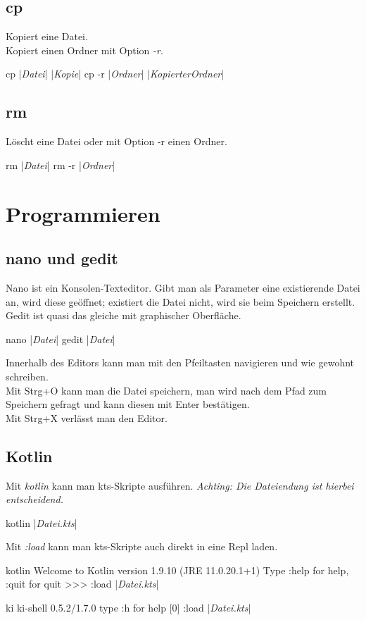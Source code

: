 \subsection{cp}
Kopiert eine Datei.\\
Kopiert einen Ordner mit Option \textit{-r}.
\begin{bashcode}
    cp |\textit{Datei}| |\textit{Kopie}|
    cp -r |\textit{Ordner}| |\textit{KopierterOrdner}|
\end{bashcode}

\subsection{rm}
Löscht eine Datei oder mit Option -r einen Ordner.
\begin{bashcode}
    rm |\textit{Datei}|
    rm -r |\textit{Ordner}|
\end{bashcode}

\section{Programmieren}
\subsection{nano und gedit}
Nano ist ein Konsolen-Texteditor. Gibt man als Parameter eine existierende Datei an, wird diese geöffnet; existiert die Datei nicht, wird sie beim Speichern erstellt. Gedit ist quasi das gleiche mit graphischer Oberfläche.
\begin{bashcode}
    nano |\textit{Datei}|
    gedit |\textit{Datei}|
\end{bashcode}
Innerhalb des Editors kann man mit den Pfeiltasten navigieren und wie gewohnt schreiben.\\
Mit Strg+O kann man die Datei speichern, man wird nach dem Pfad zum Speichern gefragt und kann diesen mit Enter bestätigen.\\
Mit Strg+X verlässt man den Editor.

\subsection{Kotlin}
Mit \textit{kotlin} kann man kts-Skripte ausführen.
\emph{Achting: Die Dateiendung ist hierbei entscheidend.}
\begin{bashcode}
    kotlin |\textit{Datei.kts}|
\end{bashcode}

Mit \textit{:load} kann man kts-Skripte
auch direkt in eine Repl laden.
\begin{bashcode}
    kotlin
    Welcome to Kotlin version 1.9.10 (JRE 11.0.20.1+1)
    Type :help for help, :quit for quit
    >>> :load |\textit{Datei.kts}|

    ki
    ki-shell 0.5.2/1.7.0
    type :h for help
    [0] :load |\textit{Datei.kts}|
\end{bashcode}


